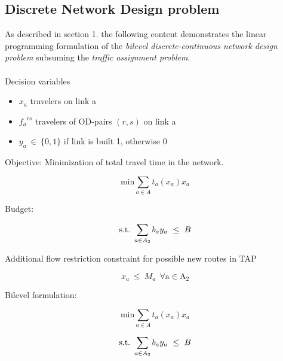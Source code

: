 \documentclass[a4paper, 12pt]{article}
\begin{document}
\subsection{Discrete Network Design problem}
As described in section 1. the following content demonstrates the linear programming formulation of the \textit{bilevel discrete-continuous network design problem} subsuming the \textit{traffic assignment problem}.\\~\\
Decision variables
\begin{itemize}
\item $x_{a}$ travelers on link a
\item ${f_{a}}^{rs}$ travelers of OD-pairs $\left(r,s\right)$ on link a
\item $y_{a}\ \in\ {\{}0,1{\}}$ if link is built 1, otherwise 0
\end{itemize}
Objective: Minimization of total travel time in the network.
\begin{large}
\boldmath\begin{equation*}
\mathrm{min}\sum_{a\in{A}} t_{a}\left(x_{a}\right)x_{a} 
\end{equation*}
\end{large}
Budget:
\begin{large}
\boldmath\begin{equation*}
\mathrm{s.t.}\ \sum_{a\in{A_{2}}} b_{a}y_{a}\ \leq \ B \\
\end{equation*}
\end{large}
Additional flow restriction constraint for possible new routes in TAP
\begin{large}
\boldmath\begin{equation*}
x_{a}\ \leq\ M_{a}\ \ \mathrm{\forall{a}\in{A_{2}}}
\end{equation*}
\end{large} 
Bilevel formulation:
\begin{large}
\boldmath\begin{equation*}
\mathrm{min}\sum_{a\in{A}} t_{a}\left(x_{a}\right)x_{a} 
\end{equation*}
\end{large}
\begin{large}
\boldmath\begin{equation*}
\mathrm{s.t.}\ \sum_{a\in{A_{2}}} b_{a}y_{a}\ \leq \ B \\
\end{equation*}
\end{large}
\end{document}
